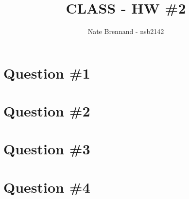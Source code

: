 \documentclass[11pt]{article}
\author{Nate Brennand - nsb2142}
\title{CLASS - HW \#2}
\begin{document}
\setlength{\parskip}{.1 in}

\maketitle
\newpage

\section*{Question \#1}
 \newpage

\section*{Question \#2}
 \newpage

\section*{Question \#3}
 \newpage

\section*{Question \#4}
 \newpage
\end{document}
